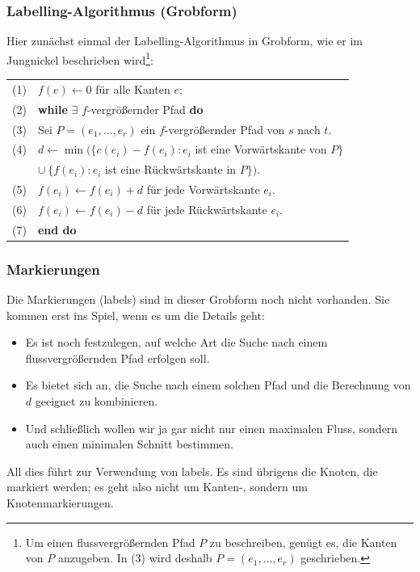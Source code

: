 \documentclass[smaller]{beamer}
\begin{document}
\begin{frame}
 \frametitle{Labelling-Algorithmus (Grobform)}
   Hier zunächst einmal der \alert{Labelling-Algorithmus in Grobform}, wie er im Jungnickel beschrieben wird\footnote{Um einen flussvergrößernden Pfad $P$ zu beschreiben, genügt es, die Kanten von $P$ anzugeben. In (3) wird deshalb $P=(e_1,\ldots,e_r)$ geschrieben.}:
\begin{tabular}{rl}
(1)& $f(e) \leftarrow 0$ für alle Kanten $e$; \\
(2)& \textbf{while} $\exists$ $f$-vergrößernder Pfad \textbf{do} \\
(3)& \qquad Sei $P = (e_1,\ldots,e_r)$ ein $f$-vergrößernder Pfad von $s$ nach $t$. \\
(4)& \qquad $d \leftarrow \min \bigl( \bigl\{ c(e_i)-f(e_i) : e_i$ ist eine Vorwärtskante von $P \bigr\}$ \\
   & \qquad\qquad\qquad\quad $\cup\ \bigl\{ f(e_i) : e_i$ ist eine Rückwärtskante in $P \bigr\} \bigr)$. \\
(5)& \qquad $f(e_i) \leftarrow f(e_i) + d$ für jede Vorwärtskante $e_i$. \\
(6)& \qquad $f(e_i) \leftarrow f(e_i) - d$ für jede Rückwärtskante $e_i$. \\
(7)& \textbf{end do}
\end{tabular}
\end{frame}

\begin{frame}
 \frametitle{Markierungen}
 Die Markierungen (labels) sind in dieser Grobform noch nicht vorhanden. Sie kommen erst ins Spiel, wenn es um die \alert{Details} geht:
 \begin{itemize}
  \item Es ist noch festzulegen, auf welche Art die Suche nach einem flussvergrößernden Pfad erfolgen soll.
  \item Es bietet sich an, die Suche nach einem solchen Pfad und die Berechnung von $d$ geeignet zu kombinieren. 
  \item Und schließlich wollen wir ja gar nicht nur einen maximalen Fluss, sondern auch einen minimalen Schnitt bestimmen. 
 \end{itemize}
 \alert{All dies führt zur Verwendung von {\glqq}labels{\grqq}.} Es sind übrigens die Knoten, die markiert werden; es geht also nicht um Kanten-, sondern um \alert{Knotenmarkierungen}.
\end{frame}
\end{document}
